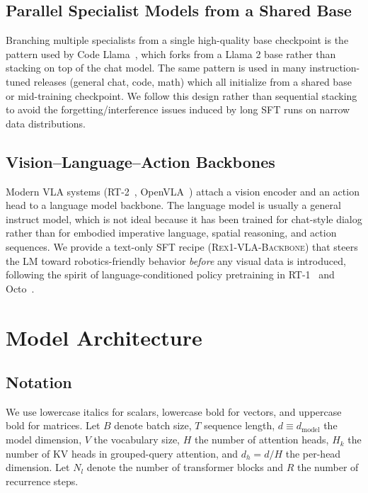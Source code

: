 \documentclass[11pt,a4paper]{article}
\begin{document}
\subsection{Parallel Specialist Models from a Shared Base}

Branching multiple specialists from a single high-quality base checkpoint is
the pattern used by Code Llama~\cite{codellama}, which forks from a Llama 2
base rather than stacking on top of the chat model. The same pattern is used
in many instruction-tuned releases (general chat, code, math) which all
initialize from a shared base or mid-training checkpoint. We follow this
design rather than sequential stacking to avoid the forgetting/interference
issues induced by long SFT runs on narrow data distributions.

\subsection{Vision–Language–Action Backbones}

Modern VLA systems (RT-2~\cite{rt2}, OpenVLA~\cite{openvla}) attach a vision
encoder and an action head to a language model backbone. The language
model is usually a general instruct model, which is not ideal because it has
been trained for chat-style dialog rather than for embodied imperative
language, spatial reasoning, and action sequences. We provide a text-only
SFT recipe (\textsc{Rex1-VLA-Backbone}) that steers the LM toward
robotics-friendly behavior \emph{before} any visual data is introduced,
following the spirit of language-conditioned policy pretraining in
RT-1~\cite{rt1} and Octo~\cite{octo}.

\section{Model Architecture}

\subsection{Notation}

We use lowercase italics for scalars, lowercase bold for vectors, and
uppercase bold for matrices. Let $B$ denote batch size, $T$ sequence length,
$d \equiv d_{\mathrm{model}}$ the model dimension, $V$ the vocabulary size,
$H$ the number of attention heads, $H_k$ the number of KV heads in
grouped-query attention, and $d_h = d / H$ the per-head dimension. Let
$N_l$ denote the number of transformer blocks and $R$ the number of
recurrence steps.
\end{document}
